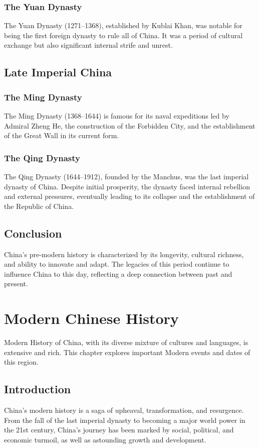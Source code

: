 \documentclass{book}
\begin{document}
\subsection{The Yuan Dynasty}
The Yuan Dynasty (1271–1368), established by Kublai Khan, was notable for being the first foreign dynasty to rule all of China. It was a period of cultural exchange but also significant internal strife and unrest.

\section{Late Imperial China}
\subsection{The Ming Dynasty}
The Ming Dynasty (1368–1644) is famous for its naval expeditions led by Admiral Zheng He, the construction of the Forbidden City, and the establishment of the Great Wall in its current form.

\subsection{The Qing Dynasty}
The Qing Dynasty (1644–1912), founded by the Manchus, was the last imperial dynasty of China. Despite initial prosperity, the dynasty faced internal rebellion and external pressures, eventually leading to its collapse and the establishment of the Republic of China.

\section{Conclusion}
China's pre-modern history is characterized by its longevity, cultural richness, and ability to innovate and adapt. The legacies of this period continue to influence China to this day, reflecting a deep connection between past and present.

\chapter{Modern Chinese History}
\label{ch:modern-chinese-history}

Modern History of China, with its diverse mixture of cultures and languages, is extensive and rich. This chapter explores important Modern events and dates of this region.

\section{Introduction}
\label{sec:introduction}
China's modern history is a saga of upheaval, transformation, and resurgence. From the fall of the last imperial dynasty to becoming a major world power in the 21st century, China's journey has been marked by social, political, and economic turmoil, as well as astounding growth and development.
\end{document}
